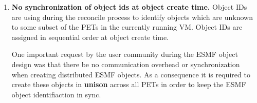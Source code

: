 %


\begin{enumerate}
\item{\bf No synchronization of object ids at object create time.}
Object IDs are using during the reconcile process to identify objects
which are unknown to some subset of the PETs in the currently running VM.
Object IDs are assigned in sequential order at object create time.

One important request by the user community during the ESMF object design was
that there be no communication overhead or synchronization when creating
distributed ESMF objects. As a consequence it is required to create these
objects in {\bf unison} across all PETs in order to keep the ESMF object
identifiaction in sync.

\end{enumerate}



